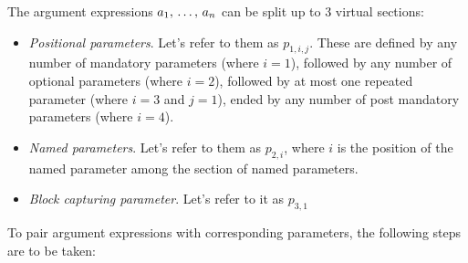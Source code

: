 The argument expressions $a_1 ,\, \ldots ,\, a_n$ can be split up to 3 virtual sections: 
\begin{itemize}

\item[] {\em Positional parameters}. Let's refer to them as $p_{1,i,j}$. These are defined by any number of mandatory parameters (where $i = 1$), followed by any number of optional parameters (where $i = 2$), followed by at most one repeated parameter (where $i = 3$ and $j = 1$), ended by any number of post mandatory parameters (where $i = 4$). 

\item[] {\em Named parameters}. Let's refer to them as $p_{2,i}$, where $i$ is the position of the named parameter among the section of named parameters. 

\item[] {\em Block capturing parameter}. Let's refer to it as $p_{3,1}$

\end{itemize}
To pair argument expressions with corresponding parameters, the following steps are to be taken:
